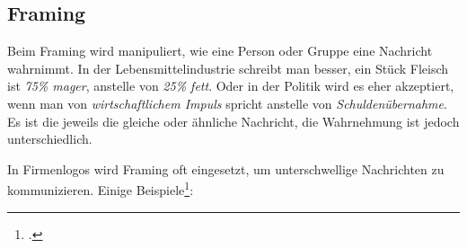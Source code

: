 \subsection{Framing}
Beim Framing wird manipuliert, wie eine Person oder Gruppe eine Nachricht wahrnimmt. In der Lebensmittelindustrie schreibt man besser, ein Stück Fleisch ist \textit{75\% mager}, anstelle von \textit{25\% fett}. Oder in der Politik wird es eher akzeptiert, wenn man von \textit{wirtschaftlichem Impuls} spricht anstelle von \textit{Schuldenübernahme}. Es ist die jeweils die gleiche oder ähnliche Nachricht, die Wahrnehmung ist jedoch unterschiedlich.

In Firmenlogos wird Framing oft eingesetzt, um unterschwellige Nachrichten zu kommunizieren. Einige Beispiele\footcite{Versteckte_Botschaften_in_Logos_2015-05-16}:

